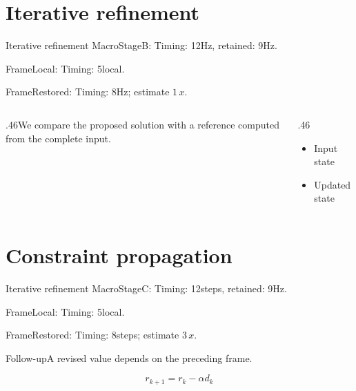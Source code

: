 \documentclass[9pt,aspectratio=43]{beamer}
\newcommand{\fuzzlayerA}[1]{\textrm{#1}}
\newcommand{\fuzzterm}[1]{\fuzzlayerA{#1}}
\newcommand{\fuzzpair}[2]{\fuzzterm{#1}: #2}
\newcommand{\fuzzunit}{Hz}
\let\fuzzoriginalunit\fuzzunit
\newcommand{\fuzzcoefficient}{1}
\newcommand{\fuzzscale}[2][\fuzzcoefficient]{#1\,#2}
\begin{document}
\section{Iterative refinement}
\begin{frame}[t]{Iterative refinement}
\fuzzpair{MacroStageB}{Timing: 12\fuzzunit, retained: 9\fuzzoriginalunit.}\par
{\renewcommand{\fuzzunit}{local}\fuzzpair{FrameLocal}{Timing: 5\fuzzunit.}\par}
\fuzzpair{FrameRestored}{Timing: 8\fuzzunit; estimate $\fuzzscale{x}$.}\par
\begin{columns}[T]\begin{column}{.46\textwidth}We compare the proposed solution with a reference computed from the complete input.\end{column}\begin{column}{.46\textwidth}\begin{itemize}\item Input state\item Updated state\end{itemize}\end{column}\end{columns}
\end{frame}
\renewcommand{\fuzzunit}{steps}
\renewcommand{\fuzzcoefficient}{3}
\renewcommand{\fuzzterm}[1]{{\textrm{#1}}}
\section{Constraint propagation}
\begin{frame}[t]{Iterative refinement}
\fuzzpair{MacroStageC}{Timing: 12\fuzzunit, retained: 9\fuzzoriginalunit.}\par
{\renewcommand{\fuzzunit}{local}\fuzzpair{FrameLocal}{Timing: 5\fuzzunit.}\par}
\fuzzpair{FrameRestored}{Timing: 8\fuzzunit; estimate $\fuzzscale{x}$.}\par
\begin{block}{Follow-up}\fuzzterm{A revised value} depends on the preceding frame.\end{block}
\[r_{k+1}=r_k-\alpha d_k\]
\end{frame}
\renewcommand{\fuzzunit}{Hz}
\renewcommand{\fuzzcoefficient}{4}
\renewcommand{\fuzzterm}[1]{{\textit{#1}}}
\end{document}
